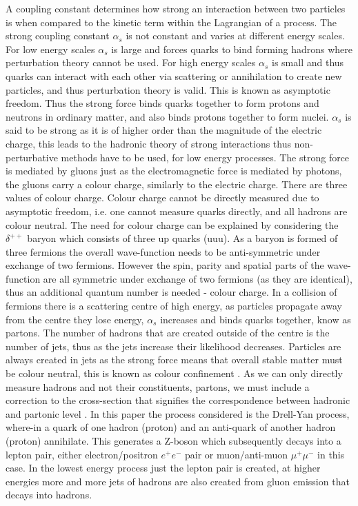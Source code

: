 \documentclass[12pt, onecolumn]{revtex4}    %
\begin{document}
A coupling constant determines how strong an interaction between two particles is when compared to the kinetic term within the Lagrangian of a process. The strong coupling constant ${\alpha _s}$ is not constant and varies at different energy scales. For low energy scales ${\alpha _s}$ is large and forces quarks to bind forming hadrons where perturbation theory cannot be used. For high energy scales ${\alpha _s}$ is small and thus quarks can interact with each other via scattering or annihilation to create new particles, and thus perturbation theory is valid. This is known as asymptotic freedom. Thus the strong force binds quarks together to form protons and neutrons in ordinary matter, and also binds protons together to form nuclei. ${\alpha _s}$ is said to be strong as it is of higher order than the magnitude of the electric charge, this leads to the hadronic theory of strong interactions thus non-perturbative methods have to be used, for low energy processes. The strong force is mediated by gluons just as the electromagnetic force is mediated by photons, the gluons carry a colour charge, similarly to the electric charge. There are three values of colour charge. Colour charge cannot be directly measured due to asymptotic freedom, i.e. one cannot measure quarks directly, and all hadrons are colour neutral. The need for colour charge can be explained by considering the ${\delta^{++}}$ baryon which consists of three up quarks (uuu). As a baryon is formed of three fermions the overall wave-function needs to be anti-symmetric under exchange of two fermions. However the spin, parity and spatial parts of the wave-function are all symmetric under exchange of two fermions (as they are identical), thus an additional quantum number is needed - colour charge.  In a collision of fermions there is a scattering centre of high energy, as particles propagate away from the centre they lose energy, ${\alpha _s}$ increases and binds quarks together, know as partons. The number of hadrons that are created outside of the centre is the number of jets, thus as the jets increase their likelihood decreases. Particles are always created in jets as the strong force means that overall stable matter must be colour neutral, this is known as colour confinement \cite{BOOK}. As we can only directly measure hadrons and not their constituents, partons, we must include a correction to the cross-section that signifies the correspondence between hadronic and partonic level \cite{DMP}. In this paper the process considered is the Drell-Yan process, where-in a quark of one hadron (proton) and an anti-quark of another hadron (proton) annihilate. This generates a Z-boson which subsequently decays into a lepton pair, either electron/positron ${e^+e^-}$ pair or muon/anti-muon ${\mu^+\mu^-}$ in this case. In the lowest energy process just the lepton pair is created, at higher energies more and more jets of hadrons are also created from gluon emission that decays into hadrons. 
\end{document}
